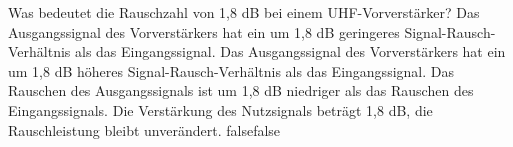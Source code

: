     {Was bedeutet die Rauschzahl von 1,8 dB bei einem UHF-Vorverstärker?}
    {Das Ausgangssignal des Vorverstärkers hat ein um 1,8 dB geringeres Signal-Rausch-Verhältnis als das Eingangssignal.}
    {Das Ausgangssignal des Vorverstärkers hat ein um 1,8 dB höheres Signal-Rausch-Verhältnis als das Eingangssignal.}
    {Das Rauschen des Ausgangssignals ist um 1,8 dB niedriger als das Rauschen des Eingangssignals.}
    {Die Verstärkung des Nutzsignals beträgt 1,8 dB, die Rauschleistung bleibt unverändert.}
    {false}{false}